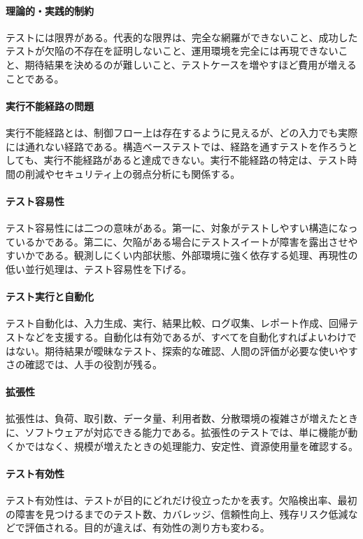 \paragraph{理論的・実践的制約}
テストには限界がある。代表的な限界は、完全な網羅ができないこと、成功したテストが欠陥の不存在を証明しないこと、運用環境を完全には再現できないこと、期待結果を決めるのが難しいこと、テストケースを増やすほど費用が増えることである。

\paragraph{実行不能経路の問題}
実行不能経路とは、制御フロー上は存在するように見えるが、どの入力でも実際には通れない経路である。構造ベーステストでは、経路を通すテストを作ろうとしても、実行不能経路があると達成できない。実行不能経路の特定は、テスト時間の削減やセキュリティ上の弱点分析にも関係する。

\paragraph{テスト容易性}
テスト容易性には二つの意味がある。第一に、対象がテストしやすい構造になっているかである。第二に、欠陥がある場合にテストスイートが障害を露出させやすいかである。観測しにくい内部状態、外部環境に強く依存する処理、再現性の低い並行処理は、テスト容易性を下げる。

\paragraph{テスト実行と自動化}
テスト自動化は、入力生成、実行、結果比較、ログ収集、レポート作成、回帰テストなどを支援する。自動化は有効であるが、すべてを自動化すればよいわけではない。期待結果が曖昧なテスト、探索的な確認、人間の評価が必要な使いやすさの確認では、人手の役割が残る。

\paragraph{拡張性}
拡張性は、負荷、取引数、データ量、利用者数、分散環境の複雑さが増えたときに、ソフトウェアが対応できる能力である。拡張性のテストでは、単に機能が動くかではなく、規模が増えたときの処理能力、安定性、資源使用量を確認する。

\paragraph{テスト有効性}
テスト有効性は、テストが目的にどれだけ役立ったかを表す。欠陥検出率、最初の障害を見つけるまでのテスト数、カバレッジ、信頼性向上、残存リスク低減などで評価される。目的が違えば、有効性の測り方も変わる。

